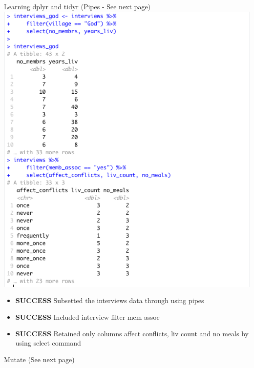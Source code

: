 \documentclass{article}
\begin{document}
Learning dplyr and tidyr (Pipes - See next page) \\
\includegraphics[width=\textwidth]{Images/RStudio_14.png} 
\begin{itemize}
\item \textbf{SUCCESS} Subsetted the interviews data through using pipes
\item \textbf{SUCCESS} Included interview filter mem assoc
\item \textbf{SUCCESS} Retained only columns affect conflicts, liv count and no meals by using select command
\end{itemize}
Mutate (See next page) \\
\end{document}
